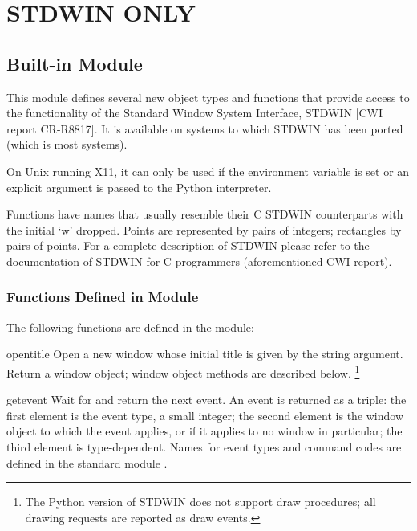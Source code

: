 \chapter{STDWIN ONLY}

\section{Built-in Module }

This module defines several new object types and functions that
provide access to the functionality of the Standard Window System
Interface, STDWIN [CWI report CR-R8817].
It is available on systems to which STDWIN has been ported (which is
most systems).

On Unix running X11, it can only be used if the 
environment variable is set or an explicit  argument is passed to the Python interpreter.

Functions have names that usually resemble their C STDWIN counterparts
with the initial `w' dropped.
Points are represented by pairs of integers; rectangles
by pairs of points.
For a complete description of STDWIN please refer to the documentation
of STDWIN for C programmers (aforementioned CWI report).

\subsection{Functions Defined in Module }

The following functions are defined in the  module:

\renewcommand{\indexsubitem}{(in module stdwin)}
\begin{funcdesc}{open}{title}
Open a new window whose initial title is given by the string argument.
Return a window object; window object methods are described below.%
\footnote{The Python version of STDWIN does not support draw procedures; all
	drawing requests are reported as draw events.}
\end{funcdesc}

\begin{funcdesc}{getevent}{}
Wait for and return the next event.
An event is returned as a triple: the first element is the event
type, a small integer; the second element is the window object to which
the event applies, or
if it applies to no window in particular;
the third element is type-dependent.
Names for event types and command codes are defined in the standard
module
.
\end{funcdesc}

